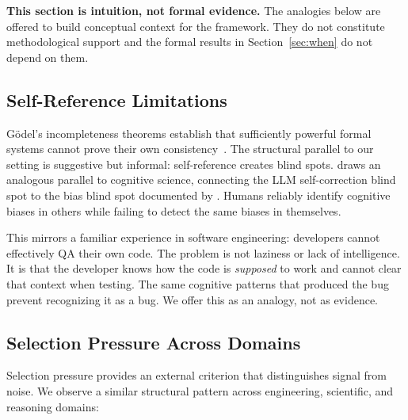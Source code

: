 \documentclass[11pt]{article}
\begin{document}
\textbf{This section is intuition, not formal evidence.} The analogies below are offered to build conceptual context for the framework. They do not constitute methodological support and the formal results in Section~\ref{sec:when} do not depend on them.

\subsection{Self-Reference Limitations}

Gödel's incompleteness theorems establish that sufficiently powerful formal systems cannot prove their own consistency~\citep{godel1931}. The structural parallel to our setting is suggestive but informal: self-reference creates blind spots. \citet{tsui2025selfcorrection} draws an analogous parallel to cognitive science, connecting the LLM self-correction blind spot to the bias blind spot documented by \citet{pronin2002bias}. Humans reliably identify cognitive biases in others while failing to detect the same biases in themselves.

This mirrors a familiar experience in software engineering: developers cannot effectively QA their own code. The problem is not laziness or lack of intelligence. It is that the developer knows how the code is \textit{supposed} to work and cannot clear that context when testing. The same cognitive patterns that produced the bug prevent recognizing it as a bug. We offer this as an analogy, not as evidence.

\subsection{Selection Pressure Across Domains}

Selection pressure provides an external criterion that distinguishes signal from noise. We observe a similar structural pattern across engineering, scientific, and reasoning domains:
\end{document}
